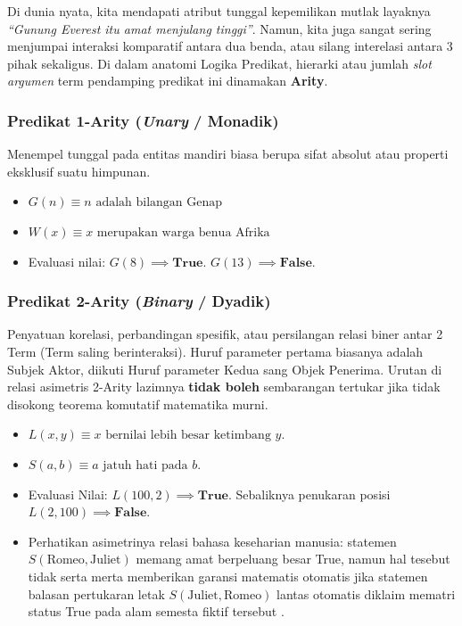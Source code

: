 Di dunia nyata, kita mendapati atribut tunggal kepemilikan mutlak layaknya \textit{``Gunung Everest itu amat menjulang tinggi''}. Namun, kita juga sangat sering menjumpai interaksi komparatif antara dua benda, atau silang interelasi antara 3 pihak sekaligus. Di dalam anatomi Logika Predikat, hierarki atau jumlah \textit{slot argumen} term pendamping predikat ini dinamakan \textbf{Arity}.

\subsubsection{Predikat 1-Arity (\textit{Unary} / Monadik)}
Menempel tunggal pada entitas mandiri biasa berupa sifat absolut atau properti eksklusif suatu himpunan.
\begin{itemize}
    \item $G(n) \equiv n \text{ adalah bilangan Genap}$
    \item $W(x) \equiv x \text{ merupakan warga benua Afrika}$
    \item Evaluasi nilai: $G(8) \implies \textbf{True}$. $G(13) \implies \textbf{False}$.
\end{itemize}

\subsubsection{Predikat 2-Arity (\textit{Binary} / Dyadik)}
Penyatuan korelasi, perbandingan spesifik, atau persilangan relasi biner antar 2 Term (Term saling berinteraksi). Huruf parameter pertama biasanya adalah Subjek Aktor, diikuti Huruf parameter Kedua sang Objek Penerima. Urutan di relasi asimetris 2-Arity lazimnya \textbf{tidak boleh} sembarangan tertukar jika tidak disokong teorema komutatif matematika murni.
\begin{itemize}
    \item $L(x, y) \equiv x \text{ bernilai lebih besar ketimbang } y$.
    \item $S(a, b) \equiv a \text{ jatuh hati pada } b$.
    \item Evaluasi Nilai: $L(100, 2) \implies \textbf{True}$. Sebaliknya penukaran posisi $L(2, 100) \implies \textbf{False}$. 
    \item Perhatikan asimetrinya relasi bahasa keseharian manusia: statemen $S(\text{Romeo}, \text{Juliet})$ memang amat berpeluang besar True, namun hal tesebut tidak serta merta memberikan garansi matematis otomatis jika statemen balasan pertukaran letak $S(\text{Juliet}, \text{Romeo})$ lantas otomatis diklaim mematri status True pada alam semesta fiktif tersebut \cite{wiki_first_order_logic}.
\end{itemize}

